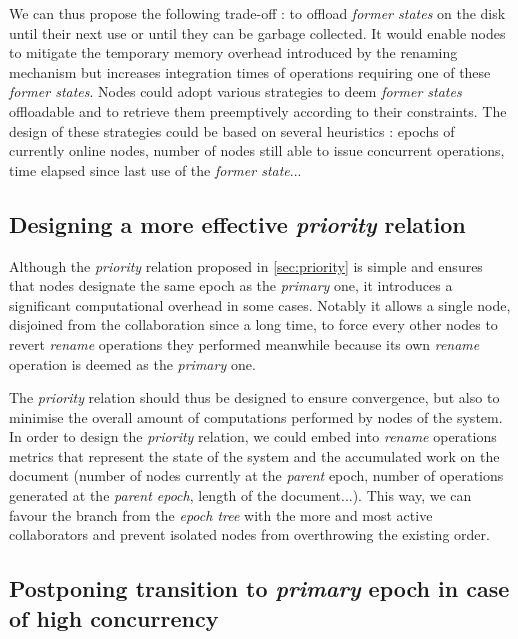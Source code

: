 \documentclass[10pt,journal,compsoc]{IEEEtran}
\begin{document}
We can thus propose the following trade-off : to offload \emph{former states} on the disk until their next use or until they can be garbage collected.
It would enable nodes to mitigate the temporary memory overhead introduced by the renaming mechanism but increases integration times of operations requiring one of these \emph{former states}.
Nodes could adopt various strategies to deem \emph{former states} offloadable and to retrieve them preemptively according to their constraints.
The design of these strategies could be based on several heuristics : epochs of currently online nodes, number of nodes still able to issue concurrent operations, time elapsed since last use of the \emph{former state}...

\subsection{Designing a more effective \emph{priority} relation}
\label{sec:designing-more-effective-priority-relation}

Although the \emph{priority} relation proposed in \autoref{sec:priority} is simple and ensures that nodes designate the same epoch as the \emph{primary} one, it introduces a significant computational overhead in some cases.
Notably it allows a single node, disjoined from the collaboration since a long time, to force every other nodes to revert \emph{rename} operations they performed meanwhile because its own \emph{rename} operation is deemed as the \emph{primary} one.

The \emph{priority} relation should thus be designed to ensure convergence, but also to minimise the overall amount of computations performed by nodes of the system.
In order to design the \emph{priority} relation, we could embed into \emph{rename} operations metrics that represent the state of the system and the accumulated work on the document (number of nodes currently at the \emph{parent} epoch, number of operations generated at the \emph{parent epoch}, length of the document...).
This way, we can favour the branch from the \emph{epoch tree} with the more and most active collaborators and prevent isolated nodes from overthrowing the existing order.

\subsection{Postponing transition to \emph{primary} epoch in case of high concurrency}
\label{sec:postponing-transition-to-new-epoch}
\end{document}
